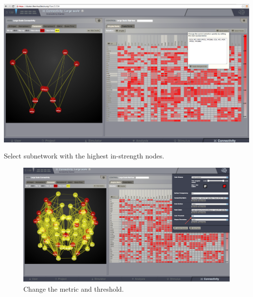 \documentclass{tufte-handout}
\begin{document}
\begin{marginfigure}
  \includegraphics[width=0.9\linewidth]{Handout_UI_ModellingStructuralLesions_SelectSubnetwork}%
  \caption{Select subnetwork with the highest in-strength nodes.}%
  \label{fig:step_subnetwork}%
\end{marginfigure}
\vspace{1.1cm}
\begin{figure}[h]
  \includegraphics[width=0.9\linewidth]{Handout_UI_ModellingStructuralLesions_ChangeNodeColourThreshold}%
  \caption{Change the metric and threshold.}%
  \label{fig:step_change_threshold}%
\end{figure}
\newpage
\end{document}
